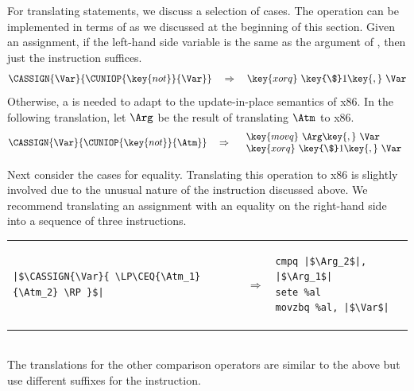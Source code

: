 \documentclass[7x10]{TimesAPriori_MIT}%
\begin{document}
For translating statements, we discuss a selection of cases.  The 
operation can be implemented in terms of  as we discussed
at the beginning of this section. Given an assignment, if the
left-hand side variable is the same as the argument of ,
then just the  instruction suffices.
\[
\CASSIGN{\Var}{ \CUNIOP{\key{not}}{\Var} }
\quad\Rightarrow\quad
\key{xorq}~\key{\$}1\key{,}~\Var
\]
Otherwise, a  is needed to adapt to the update-in-place
semantics of x86. In the following translation, let $\Arg$ be the
result of translating $\Atm$ to x86.
\[
\CASSIGN{\Var}{ \CUNIOP{\key{not}}{\Atm} }
\quad\Rightarrow\quad
\begin{array}{l}
\key{movq}~\Arg\key{,}~\Var\\
\key{xorq}~\key{\$}1\key{,}~\Var
\end{array}
\]

Next consider the cases for equality.  Translating this operation to
x86 is slightly involved due to the unusual nature of the 
instruction discussed above.  We recommend translating an assignment
with an equality on the right-hand side into a sequence of three
instructions. \\
\begin{tabular}{lll}
\begin{minipage}{0.4\textwidth}
\begin{lstlisting}
|$\CASSIGN{\Var}{ \LP\CEQ{\Atm_1}{\Atm_2} \RP }$|
\end{lstlisting}
\end{minipage}
&
$\Rightarrow$
&
\begin{minipage}{0.4\textwidth}
\begin{lstlisting}
cmpq |$\Arg_2$|, |$\Arg_1$|
sete %al
movzbq %al, |$\Var$|
\end{lstlisting}
\end{minipage}
\end{tabular}  \\
The translations for the other comparison operators are similar to the
above but use different suffixes for the  instruction.
\end{document}
